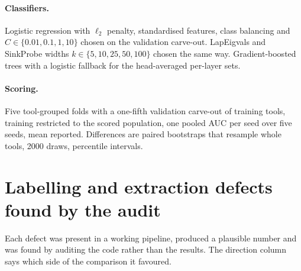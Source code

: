\paragraph{Classifiers.} Logistic regression with $\ell_2$ penalty, standardised features, class balancing and $C \in \{0.01, 0.1, 1, 10\}$ chosen on the validation carve-out. LapEigvals and SinkProbe widths $k \in \{5, 10, 25, 50, 100\}$ chosen the same way. Gradient-boosted trees with a logistic fallback for the head-averaged per-layer sets.

\paragraph{Scoring.} Five tool-grouped folds with a one-fifth validation carve-out of training tools, training restricted to the scored population, one pooled AUC per seed over five seeds, mean reported. Differences are paired bootstraps that resample whole tools, 2000 draws, percentile intervals.

\section{Labelling and extraction defects found by the audit}
\label{app:audit}

Each defect was present in a working pipeline, produced a plausible number and was found by auditing the code rather than the results. The direction column says which side of the comparison it favoured.

